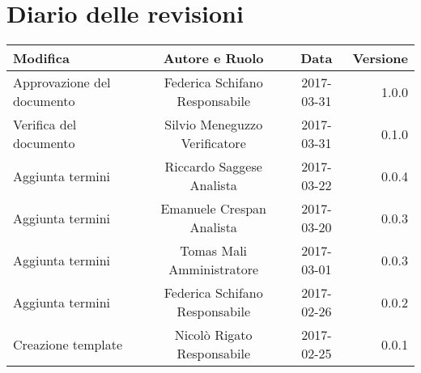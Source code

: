 
\section*{Diario delle revisioni}

\begin{center}
  \begin{tabular}{|l|c|c|r|}
    \hline
    \textbf{Modifica} & \textbf{Autore e Ruolo} & \textbf{Data} & \textbf{Versione} \\
    \hline Approvazione del documento & Federica Schifano Responsabile & 2017-03-31 & 1.0.0 \\ 
    \hline Verifica del documento & Silvio Meneguzzo Verificatore & 2017-03-31 & 0.1.0 \\ 
    \hline Aggiunta termini & Riccardo Saggese Analista & 2017-03-22 & 0.0.4 \\ 
    \hline Aggiunta termini & Emanuele Crespan Analista & 2017-03-20 & 0.0.3 \\ 
    \hline Aggiunta termini & Tomas Mali Amministratore & 2017-03-01 & 0.0.3 \\ 
    \hline Aggiunta termini & Federica Schifano Responsabile & 2017-02-26 & 0.0.2 \\
    \hline Creazione template & Nicolò Rigato Responsabile & 2017-02-25 & 0.0.1 \\
    \hline

  \end{tabular}
\end{center}


